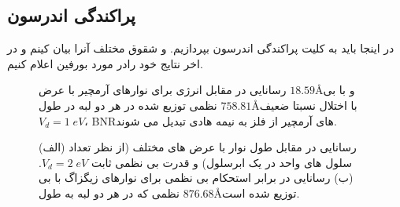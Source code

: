 \subsection{پراکندگی اندرسون}
 در اینجا باید به کلیت پراکندگی اندرسون بپردازیم. و شقوق مختلف آنرا بیان کینم و در اخر نتایج خود رادر مورد بورفین اعلام کنیم.

\begin{figure}[!ht]
    \centering
      
      \caption{رسانایی در مقابل انرژی برای نوارهای آرمچیر با عرض $18.59$\AA و با بی نظمی توزیع شده در هر دو لبه در طول $758.81$\AA با اختلال نسبتا ضعیف $V_d=1\;eV$، BNRهای آرمچیر از فلز به نیمه هادی تبدیل می شوند.}
      \label{armdisorder}
    \end{figure}
    
    \begin{figure}[!ht]
      \centering
      
      \caption{(الف) رسانایی در مقابل طول نوار با عرض های مختلف (از نظر تعداد سلول های واحد در یک ابرسلول) و قدرت بی نظمی ثابت $V_d=2\;eV$. (ب) رسانایی در برابر استحکام بی نظمی برای نوارهای زیگزاگ با بی نظمی که در هر دو لبه به طول $876.68$\AA توزیع شده است.}
      \label{zigzag-width-strangth}
    \end{figure}  

